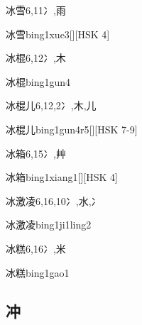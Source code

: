\begin{Entry}{冰雪}{6,11}{⼎,⾬}
  \begin{Phonetics}{冰雪}{bing1xue3}[][HSK 4]
  \end{Phonetics}
\end{Entry}

\begin{Entry}{冰棍}{6,12}{⼎,⽊}
  \begin{Phonetics}{冰棍}{bing1gun4}
  \end{Phonetics}
\end{Entry}

\begin{Entry}{冰棍儿}{6,12,2}{⼎,⽊,⼉}
  \begin{Phonetics}{冰棍儿}{bing1gun4r5}[][HSK 7-9]
  \end{Phonetics}
\end{Entry}

\begin{Entry}{冰箱}{6,15}{⼎,⾋}
  \begin{Phonetics}{冰箱}{bing1xiang1}[][HSK 4]
  \end{Phonetics}
\end{Entry}

\begin{Entry}{冰激凌}{6,16,10}{⼎,⽔,⼎}
  \begin{Phonetics}{冰激凌}{bing1ji1ling2}
  \end{Phonetics}
\end{Entry}

\begin{Entry}{冰糕}{6,16}{⼎,⽶}
  \begin{Phonetics}{冰糕}{bing1gao1}
  \end{Phonetics}
\end{Entry}

\subsection*{冲}

